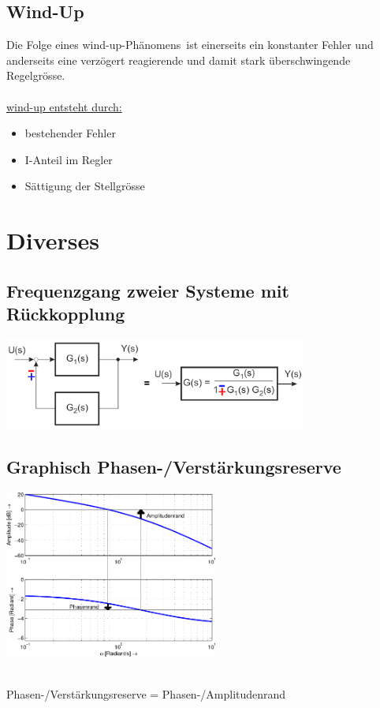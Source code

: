 	\subsection{Wind-Up }
		Die Folge eines \glqq wind-up-Phänomens\grqq\ ist einerseits ein konstanter
		Fehler und anderseits eine verzögert reagierende und damit stark überschwingende
		Regelgrösse.\\ \\
		\underline{wind-up entsteht durch:}\\
		\begin{itemize}
		\item bestehender Fehler
		\item I-Anteil im Regler
		\item Sättigung der Stellgrösse
		\end{itemize}
		
	
\section{Diverses}
	\subsection{Frequenzgang zweier Systeme mit Rückkopplung }
			\begin{center}
        		\includegraphics[height=3cm]{./bilder/feedback.png}
        	\end{center}

	\subsection{Graphisch Phasen-/Verstärkungsreserve}
		\parbox{7cm}{
		\includegraphics[width=7cm]{./bilder/bode-stabilitaet.png}
		}\\
		Phasen-/Verstärkungsreserve = Phasen-/Amplitudenrand
		
